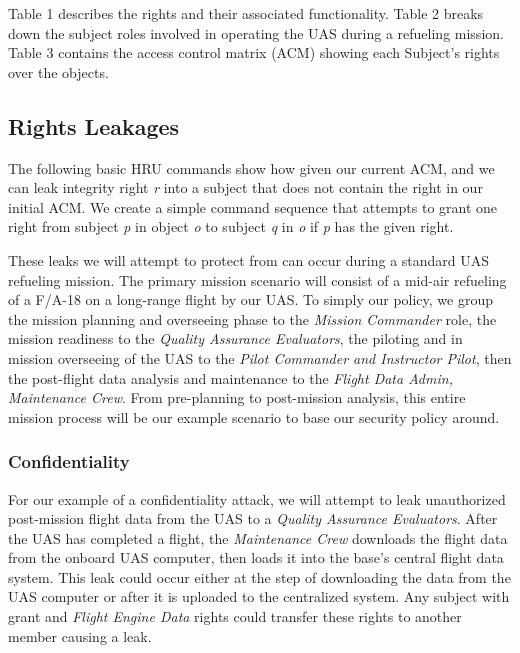 \documentclass[10pt,journal,compsoc]{IEEEtran}
\begin{document}
  Table 1 describes the rights and their associated functionality. Table 2 breaks down the subject roles involved in operating the UAS during a refueling mission. Table 3 contains the access control matrix (ACM) showing each Subject's rights over the objects.
  
  \subsection{Rights Leakages}
  
  The following basic HRU commands show how given our current ACM, and we can leak integrity right \textit{r} into a subject that does not contain the right in our initial ACM.
  We create a simple command sequence that attempts to grant one right from subject \textit{p} in object \textit{o} to subject \textit{q} in \textit{o} if \textit{p} has the given right.

  These leaks we will attempt to protect from can occur during a standard UAS refueling mission. The primary mission scenario will consist of a mid-air refueling of a F/A-18 on a long-range flight by our UAS. To simply our policy, we group the mission planning and overseeing phase to the \textit{Mission Commander} role, the mission readiness to the \textit{Quality Assurance Evaluators}, the piloting and in mission overseeing of the UAS to the \textit{Pilot Commander and Instructor Pilot}, then the post-flight data analysis and maintenance to the \textit{Flight Data Admin, Maintenance Crew}. From pre-planning to post-mission analysis, this entire mission process will be our example scenario to base our security policy around. 
  
  \subsubsection{Confidentiality}

  For our example of a confidentiality attack, we will attempt to leak unauthorized post-mission flight data from the UAS to a \textit{Quality Assurance Evaluators}. After the UAS has completed a flight, the \textit{Maintenance Crew} downloads the flight data from the onboard UAS computer, then loads it into the base's central flight data system. This leak could occur either at the step of downloading the data from the UAS computer or after it is uploaded to the centralized system. Any subject with grant and \textit{Flight Engine Data} rights could transfer these rights to another member causing a leak. 
  
\end{document}
